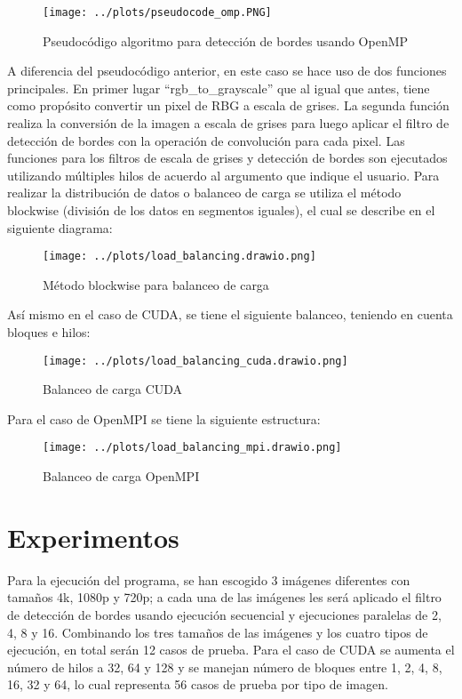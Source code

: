 \begin{itemize}
    \begin{figure}[H]
        \centering
        \texttt{[image: ../plots/pseudocode\_omp.PNG]}
        \caption{Pseudocódigo algoritmo para detección de bordes usando OpenMP}
    \end{figure}
    A diferencia del pseudocódigo anterior, en este caso se hace uso de dos funciones principales. En primer lugar ``rgb\_to\_grayscale'' que al igual que antes, tiene como propósito convertir un pixel de RBG a escala de grises. La segunda función realiza la conversión de la imagen a escala de grises para luego aplicar el filtro de detección de bordes con la operación de convolución para cada pixel.
    \newpage
    Las funciones para los filtros de escala de grises y detección de bordes son ejecutados utilizando múltiples hilos de acuerdo al argumento que indique el usuario. Para realizar la distribución de datos o balanceo de carga se utiliza el método blockwise (división de los datos en segmentos iguales), el cual se describe en el siguiente diagrama:
    \begin{figure}[H]
        \centering
        \texttt{[image: ../plots/load\_balancing.drawio.png]}
        \caption{Método blockwise para balanceo de carga}
    \end{figure}
    Así mismo en el caso de CUDA, se tiene el siguiente balanceo, teniendo en cuenta bloques e hilos:
    \begin{figure}[H]
        \centering
        \texttt{[image: ../plots/load\_balancing\_cuda.drawio.png]}
        \caption{Balanceo de carga CUDA}
    \end{figure}
    Para el caso de OpenMPI se tiene la siguiente estructura:
    \begin{figure}[H]
        \centering
        \texttt{[image: ../plots/load\_balancing\_mpi.drawio.png]}
        \caption{Balanceo de carga OpenMPI}
    \end{figure}
\end{itemize}

\section{Experimentos}

Para la ejecución del programa, se han escogido 3 imágenes diferentes con tamaños 4k, 1080p y 720p; a cada una de las imágenes les será aplicado el filtro de detección de bordes usando ejecución secuencial y ejecuciones paralelas de 2, 4, 8 y 16. Combinando los tres tamaños de las imágenes y los cuatro tipos de ejecución, en total serán 12 casos de prueba. Para el caso de CUDA se aumenta el número de hilos a 32, 64 y 128 y se manejan número de bloques entre 1, 2, 4, 8, 16, 32 y 64, lo cual representa 56 casos de prueba por tipo de imagen.

